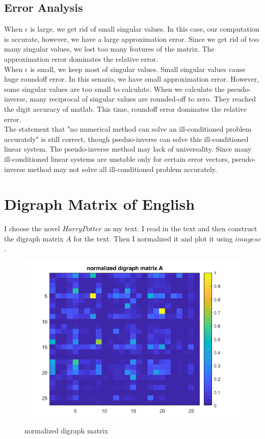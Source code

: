 \documentclass[a4paper]{article}
\begin{document}
\subsection{Error Analysis}
When $\epsilon$ is large, we get rid of small singular values. In this case, our computation is accurate, however, we have a large approximation error. Since we get rid of too many singular values, we lost too many features of the matrix. The approximation error dominates the relative error.\\
\indent When $\epsilon$ is small, we keep most of singular values. Small singular values cause huge roundoff error. In this senario, we have small approximation error. However, some singular values are too small to calculate. When we calculate the pseudo-inverse, many reciprocal of singular values are rounded-off to zero. They reached the digit accuracy of matlab. This time, roundoff error dominates the relative error.\\
\indent The statement that "no numerical method can solve an ill-conditioned problem accurately" is still correct, though pseduo-inverse can solve this ill-conditioned linear system. The pseudo-inverse method may lack of universality. Since many ill-conditioned linear systems are unstable only for certain error vectors, pseudo-inverse method may not solve all ill-conditioned problem accurately.

\section{Digraph Matrix of English}
I choose the novel $Harry Potter$ as my text. I read in the text and then construct the digraph matrix $A$ for the text. Then I normalized it and plot it using $imagesc$.

\begin{figure}[H] 
\centering 
\includegraphics[width=1.0\textwidth]{2.1-1.png}
\caption{normalized digraph matrix} 
\label{Fig.2.1-1} 
\end{figure}
\end{document}
